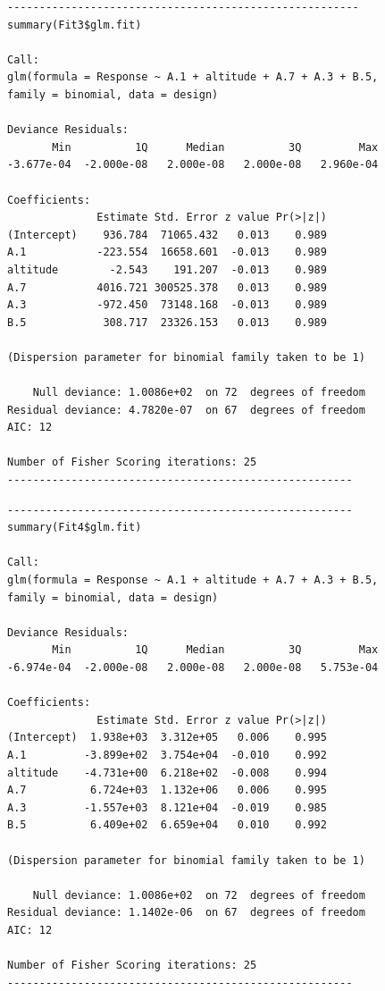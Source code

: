{\scriptsize
\noindent
\begin{minipage}[t]{.49\textwidth}
\raggedleft
\begin{verbatim}
-------------------------------------------------------
summary(Fit3$glm.fit)

Call:
glm(formula = Response ~ A.1 + altitude + A.7 + A.3 + B.5,
family = binomial, data = design)

Deviance Residuals: 
       Min          1Q      Median          3Q         Max  
-3.677e-04  -2.000e-08   2.000e-08   2.000e-08   2.960e-04  

Coefficients:
              Estimate Std. Error z value Pr(>|z|)
(Intercept)    936.784  71065.432   0.013    0.989
A.1           -223.554  16658.601  -0.013    0.989
altitude        -2.543    191.207  -0.013    0.989
A.7           4016.721 300525.378   0.013    0.989
A.3           -972.450  73148.168  -0.013    0.989
B.5            308.717  23326.153   0.013    0.989

(Dispersion parameter for binomial family taken to be 1)

    Null deviance: 1.0086e+02  on 72  degrees of freedom
Residual deviance: 4.7820e-07  on 67  degrees of freedom
AIC: 12

Number of Fisher Scoring iterations: 25
------------------------------------------------------
\end{verbatim}
\end{minipage}%
%
\hfill
%
\begin{minipage}[t]{.49\textwidth}
\raggedleft
\begin{verbatim}
------------------------------------------------------
summary(Fit4$glm.fit)

Call:
glm(formula = Response ~ A.1 + altitude + A.7 + A.3 + B.5,
family = binomial, data = design)

Deviance Residuals: 
       Min          1Q      Median          3Q         Max  
-6.974e-04  -2.000e-08   2.000e-08   2.000e-08   5.753e-04  

Coefficients:
              Estimate Std. Error z value Pr(>|z|)
(Intercept)  1.938e+03  3.312e+05   0.006    0.995
A.1         -3.899e+02  3.754e+04  -0.010    0.992
altitude    -4.731e+00  6.218e+02  -0.008    0.994
A.7          6.724e+03  1.132e+06   0.006    0.995
A.3         -1.557e+03  8.121e+04  -0.019    0.985
B.5          6.409e+02  6.659e+04   0.010    0.992

(Dispersion parameter for binomial family taken to be 1)

    Null deviance: 1.0086e+02  on 72  degrees of freedom
Residual deviance: 1.1402e-06  on 67  degrees of freedom
AIC: 12

Number of Fisher Scoring iterations: 25
------------------------------------------------------
\end{verbatim}
\end{minipage}
}

